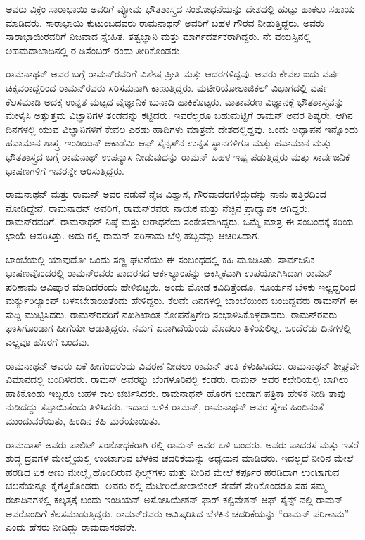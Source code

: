 ಅವರು ವಿಕ್ರಂ ಸಾರಾಭಾಯಿ ಅವರಿಗೆ ವ್ಯೋಮ ಭೌತಶಾಸ್ತ್ರದ ಸಂಶೋಧನೆಯನ್ನು ದೇಶದಲ್ಲಿ ಹುಟ್ಟು ಹಾಕಲು ಸಹಾಯ ಮಾಡಿದರು. ಸಾರಾಭಾಯಿ ಕುಟುಂಬದವರು ರಾಮನಾಥನ್ ಅವರಿಗೆ ಬಹಳ ಗೌರವ ನೀಡುತ್ತಿದ್ದರು. ಅವರು ಸಾರಾಭಾಯಿರವರಿಗೆ ನಿಜವಾದ ಸ್ನೇಹಿತ, ತತ್ವಜ್ಞಾನಿ ಮತ್ತು ಮಾರ್ಗದರ್ಶಕರಾಗಿದ್ದರು. ನೇ ವಯಸ್ಸಿನಲ್ಲಿ ಅಹಮದಾಬಾದಿನಲ್ಲಿ ರ ಡಿಸೆಂಬರ್ ರಂದು ತೀರಿಕೊಂಡರು.

ರಾಮನಾಥನ್ ಅವರ ಬಗ್ಗೆ ರಾಮನ್‍ರವರಿಗೆ ವಿಶೇಷ ಪ್ರೀತಿ ಮತ್ತು ಆದರಗಳಿದ್ದವು. ಅವರು ಕೇವಲ ಐದು ವರ್ಷ ಚಿಕ್ಕವರಾದ್ದರಿಂದ ರಾಮನ್‍ರವರು ಸರಿಸಮನಾಗಿ ಕಾಣುತ್ತಿದ್ದರು. ಮಟೀರಿಯೋ\-ಲಾಜಿಕಲ್ ವಿಭಾಗದಲ್ಲಿ  ವರ್ಷ ಕೆಲಸಮಾಡಿ ಅದಕ್ಕೆ ಉನ್ನತ ಮಟ್ಟದ ವೈಜ್ಞಾನಿಕ ಬುನಾದಿ ಹಾಕಿಕೊಟ್ಟರು. ವಾತಾವರಣ ವಿಜ್ಞಾನಕ್ಕೆ ಭೌತಶಾಸ್ತ್ರವನ್ನು ಮೇಳೈಸಿ ಅತ್ಯುತ್ತಮ ವಿಜ್ಞಾನಿಗಳ ತಂಡವನ್ನು ಕಟ್ಟಿದರು. ಇವರೆಲ್ಲರೂ ಬಹುಮಟ್ಟಿಗೆ ರಾಮನ್ ಅವರ ಶಿಷ್ಯರೇ. ಆಗಿನ ದಿನಗಳಲ್ಲಿ ಯುವ ವಿಜ್ಞಾನಿಗಳಿಗೆ ಕೇವಲ ಎರಡು ಹಾದಿಗಳು ಮಾತ್ರವೇ ದೇಶದಲ್ಲಿದ್ದವು. ಒಂದು ಅಧ್ಯಾಪನ ಇನ್ನೊಂದು ಹವಾಮಾನ ಶಾಸ್ತ್ರ. ಇಂಡಿಯನ್ ಅಕಾಡೆಮಿ ಆಫ್ ಸೈನ್ಸಸ್‍ನ ಉನ್ನತ ಸ್ಥಾನಗಳಿಗೂ ಮತ್ತು ಹವಾಮಾನ ಮತ್ತು ಭೌತಶಾಸ್ತ್ರದ ಬಗ್ಗೆ ರಾಮನಾಥ್ ಉಪನ್ಯಾಸ ನೀಡುವುದನ್ನು ರಾಮನ್ ಬಹಳ ಇಷ್ಟ ಪಡುತ್ತಿದ್ದರು ಮತ್ತು ಸಾರ್ವಜನಿಕ ಭಾಷಣಗಳಿಗೆ ಇವರನ್ನೇ ಆರಿಸುತ್ತಿದ್ದರು.

ರಾಮನಾಥನ್ ಮತ್ತು ರಾಮನ್ ಅವರ ನಡುವೆ ನೈಜ ವಿಶ್ವಾಸ, ಗೌರವಾದರಗಳಿದ್ದುದನ್ನು ನಾನು ಹತ್ತಿರದಿಂದ ನೋಡಿದ್ದೇನೆ. ರಾಮನಾಥನ್ ಅವರಿಗೆ, ರಾಮನ್‍ರವರು ನಾಯಕ ಮತ್ತು ನೆಚ್ಚಿನ ಪ್ರಾಧ್ಯಾಪಕ ಆಗಿದ್ದರು. ರಾಮನ್‍ರವರಿಗೆ, ರಾಮನಾಥನ್ ನಿಷ್ಠೆ ಮತ್ತು ಆರಾಧನೆಯ ಸಂಕೇತವಾಗಿದ್ದರು. ಒಮ್ಮೆ ಮಾತ್ರ ಈ ಸಂಬಂಧಕ್ಕೆ ಕರಿಯ ಛಾಯೆ ಆವರಿಸಿತ್ತು. ಅದು ರಲ್ಲಿ ರಾಮನ್ ಪರಿಣಾಮ ಬೆಳ್ಳಿ ಹಬ್ಬವನ್ನು ಆಚರಿಸಿದಾಗ.

ಬಾಂಬೆಯಲ್ಲಿ ಯಾವುದೋ ಒಂದು ಸಣ್ಣ ಘಟನೆಯು ಈ ಸಂಬಂಧದಲ್ಲಿ ಕಹಿ ಮೂಡಿಸಿತು. ಸಾರ್ವಜನಿಕ ಭಾಷಣವೊಂದರಲ್ಲಿ ರಾಮನ್‍ರವರು ಪಾದರಸದ ಆರ್ಕಲ್ಯಾಂಪನ್ನು ಆಕಸ್ಮಿಕವಾಗಿ ಉಪಯೋಗಿಸಿದಾಗ ರಾಮನ್ ಪರಿಣಾಮ ಆವಿಷ್ಕಾರ ಮಾಡಿದರೆಂದು ಹೇಳಿಬಿಟ್ಟರು. ಅಂದು ಮೋಡ ಕವಿದಿತ್ತೆಂದೂ, ಸೂರ್ಯನ ಬೆಳಕು ಇಲ್ಲದ್ದರಿಂದ ಮರ್ಕ್ಯುರಿಲ್ಯಾಂಪ್ ಬಳಸಬೇಕಾಯಿತೆಂದು ಹೇಳಿದ್ದರು. ಕೆಲವೇ ದಿನಗಳಲ್ಲಿ ಬಾಂಬೆಯಿಂದ ಬಂದಿದ್ದವರು ರಾಮನ್‍ಗೆ ಈ ಸುದ್ದಿ ಮುಟ್ಟಿಸಿದರು. ರಾಮನ್‍ರವರಿಗೆ ನಖಶಿಖಾಂತ ಕೋಪನೆತ್ತಿಗೇರಿ ಸಂಭಾಳಿಸಿಕೊಳ್ಳದಾದರು. ರಾಮನ್‍ರವರು ಘಾಸಿಗೊಂಡಾಗ ಹೀಗೆಯೇ ಆಡುತ್ತಿದ್ದರು. ನಮಗೆ ಏನಾಗಿದೆಯೆಂದು ಮೊದಲು ತಿಳಿಯಲಿಲ್ಲ. ಒಂದೆರೆಡು ದಿನಗಳಲ್ಲಿ ಎಲ್ಲವೂ ಹೊರಗೆ ಬಂದವು.

ರಾಮನಾಥನ್ ಅವರು ಏಕೆ ಹೀಗೆಂದರೆಂದು ವಿವರಣೆ ನೀಡಲು ರಾಮನ್ ತಂತಿ ಕಳುಹಿಸಿದರು. ರಾಮನಾಥನ್ ಶೀಘ್ರವೇ ವಿಮಾನದಲ್ಲಿ ಬಂದಿಳಿದರು. ರಾಮನ್ ಅವರನ್ನು ಬೆಂಗಳೂರಿನಲ್ಲಿ ಕಂಡರು. ರಾಮನ್ ಅವರ ಕಛೇರಿಯಲ್ಲಿ ಬಾಗಿಲು ಹಾಕಿಕೊಂಡು ಇಬ್ಬರೂ ಬಹಳ ಕಾಲ ಚರ್ಚಿಸಿದರು. ರಾಮನಾಥನ್ ಹೊರಗೆ ಬಂದಾಗ ಪತ್ರಿಕಾ ಹೇಳಿಕೆ ನೀಡಿ ತಾವು ನುಡಿದದ್ದು ತಪ್ಪಾಯಿತೆಂದು ತಿಳಿಸಿದರು. ಇದಾದ ಬಳಿಕ ರಾಮನ್, ರಾಮನಾಥನ್ ಅವರ ಸ್ನೇಹ ಹಿಂದಿನಂತೆ ಮುಂದುವರೆಯಿತು, ಹಿಂದಿನ ಕಹಿ ಮರೆಯಾಯಿತು.



ರಾಮದಾಸ್ ಅವರು ಪಾಲಿಟ್ ಸಂಶೋಧಕರಾಗಿ ರಲ್ಲಿ ರಾಮನ್ ಅವರ ಬಳಿ ಬಂದರು. ಅವರು ಪಾದರಸ ಮತ್ತು ಇತರೆ ಶುದ್ಧ ದ್ರವಗಳ ಮೇಲ್ಮೈಯಲ್ಲಿ ಉಂಟಾಗುವ ಬೆಳಕಿನ ಚದರಿಕೆಯನ್ನು ಅಧ್ಯಯನ ಮಾಡಿದರು. ಇದಲ್ಲದೆ ನೀರಿನ ಮೇಲೆ ಹರಡಿದ ಏಕ ಅಣು ಮೇಲ್ಮೈ ಹೊಂದಿರುವ ಫಿಲ್ಮ್‌ಗಳು ಮತ್ತು ನೀರಿನ ಮೇಲೆ ಕರ್ಪೂರ ಹರಡಿದಾಗ ಉಂಟಾಗುವ ಚಲನೆಯನ್ನೂ ಕೈಗೆತ್ತಿಕೊಂಡರು. ಅವರು ರಲ್ಲಿ ಮೆಟೀರಿಯೋಲಾಜಿಕಲ್ ಸೇವೆಗೆ ಸೇರಿಕೊಂಡರೂ ಸಹ ತಮ್ಮ ರಜಾದಿನಗಳಲ್ಲಿ ಕಲ್ಕತ್ತಕ್ಕೆ ಬಂದು ಇಂಡಿಯನ್ ಅಸೋಸಿಯೇಶನ್ ಫಾರ್ ಕಲ್ಟಿವೇಶನ್ ಆಫ್ ಸೈನ್ಸ್ ನಲ್ಲಿ ರಾಮನ್ ಅವರೊಂದಿಗೆ ಕೆಲಸಮಾಡುತ್ತಿದ್ದರು. ರಾಮನ್‍ರವರು ಆವಿಷ್ಕರಿಸಿದ ಬೆಳಕಿನ ಚದರಿಕೆಯನ್ನು “ರಾಮನ್ ಪರಿಣಾಮ” ಎಂದು ಹೆಸರು ನೀಡಿದ್ದು ರಾಮದಾಸರವರೇ.

